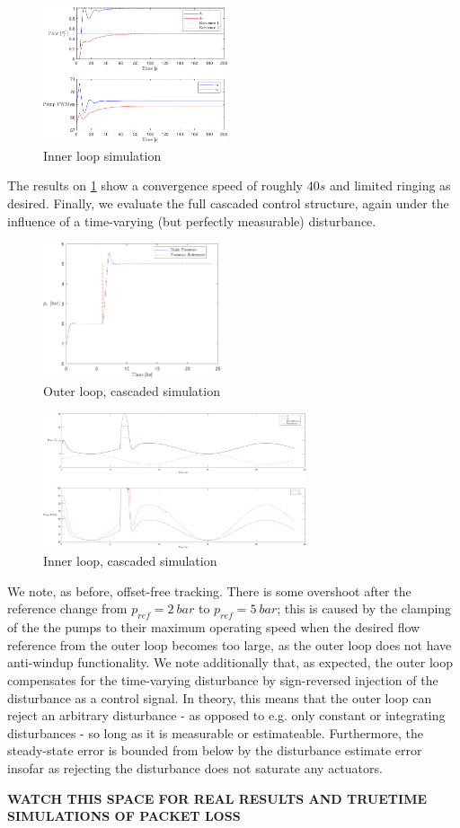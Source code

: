 \begin{figure}[h!]
	\includegraphics[width=\linewidth,height=4cm]{Graphics/PumpSimulation.pdf}
	\caption{Inner loop simulation}
	\label{fig:PumpSimulation}
\end{figure}

The results on \cref{fig:PumpSimulation} show a convergence speed of roughly $40 \si{s}$ and limited ringing as desired. Finally, we evaluate the full cascaded control structure, again under the influence of a time-varying (but perfectly measurable) disturbance.

\begin{figure}[h!]
	\includegraphics[height=4cm, width=\linewidth]{Graphics/FullSimPressures.pdf}
	\caption{Outer loop, cascaded simulation}
	\label{fig:FullSimPressure}
\end{figure}

\begin{figure}[h!]
	\includegraphics[height=4cm, width=\linewidth]{Graphics/FullSimFlows.pdf}
	\caption{Inner loop, cascaded simulation}
	\label{fig:FullSimFlows}
\end{figure}

We note, as before, offset-free tracking. There is some overshoot after the reference change from $p_{ref} = 2 \ \si{bar}$ to $p_{ref} = 5 \ \si{bar}$; this is caused by the clamping of the the pumps to their maximum operating speed when the desired flow reference from the outer loop becomes too large, as the outer loop does not have anti-windup functionality. We note additionally that, as expected, the outer loop compensates for the time-varying disturbance by sign-reversed injection of the disturbance as a control signal. In theory, this means that the outer loop can reject an arbitrary disturbance - as opposed to e.g. only constant or integrating disturbances - so long as it is measurable or estimateable. Furthermore, the steady-state error is bounded from below by the disturbance estimate error insofar as rejecting the disturbance does not saturate any actuators.


\textbf{WATCH THIS SPACE FOR REAL RESULTS AND TRUETIME SIMULATIONS OF PACKET LOSS}




